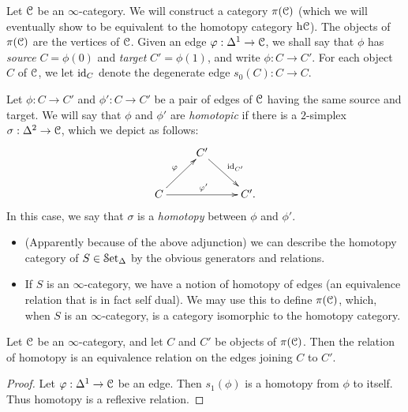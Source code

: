 \begin{1.2.3 The homotopy category}
Let $\operatorname{\mathcal{C}}$ be an $\infty$-category. We will construct a category $\pi(\operatorname{\mathcal{C}})$
(which we will eventually show to be equivalent to the homotopy category $\rm{h} \it{\operatorname{\mathcal{C}}}$). The objects of $\pi(\operatorname{\mathcal{C}})$ are the vertices of $\operatorname{\mathcal{C}}$. Given an
edge $\varphi: \Delta^1 \rightarrow \operatorname{\mathcal{C}}$, we shall say that $\phi$ has {\it source}
$C= \phi(0)$ and {\it target} $C' = \phi(1) $, and write $\phi:
C \rightarrow C'$. For each object $C$ of $\operatorname{\mathcal{C}}$, we
let $\operatorname{id}_{C}$ denote the degenerate edge $s_0(C): C \rightarrow C$.

Let $\phi: C \rightarrow C'$ and $\phi': C \rightarrow C'$ be a pair of edges of $\operatorname{\mathcal{C}}$ having
the same source and target. We will say that $\phi$ and $\phi'$ are {\it homotopic} if
there is a $2$-simplex $\sigma: \Delta^2 \rightarrow \operatorname{\mathcal{C}}$, which we depict as follows:
$$ \xymatrix{
& C' \ar[dr]^{\id_{C'}} & \\
C \ar[ur]^{\phi} \ar[rr]^{\phi'} & & C'.}$$
In this case, we say that $\sigma$ is a {\it homotopy} between $\phi$ and $\phi'$.

\begin{shaded}
\begin{itemize}\squishlist
\setlength{\parindent}{.25in}
\item (Apparently because of the above adjunction) we can describe the homotopy category of $S\in\operatorname{\mathcal{S}et}_\Delta$ by the obvious generators and relations.
\item If $S$ is an $\infty$-category, we have a notion of homotopy of edges (an equivalence relation that is in fact self dual). We may use this to define $\pi(\operatorname{\mathcal{C}})$, which, when $S$ is an $\infty$-category, is a category isomorphic to the homotopy category.
\end{itemize}
\end{shaded}

\begin{proposition}\label{extneeded}
Let $\operatorname{\mathcal{C}}$ be an $\infty$-category, and let $C$ and $C'$ be objects of
$\pi(\operatorname{\mathcal{C}})$. Then the relation of homotopy is an equivalence relation
on the edges joining $C$ to $C'$.
\end{proposition}

\begin{proof}
Let $\varphi: \Delta^1 \rightarrow \operatorname{\mathcal{C}}$ be an edge. Then $s_1(\phi)$ is a homotopy from $\phi$ to
itself. Thus homotopy is a reflexive relation.


\end{proof}
\end{1.2.3 The homotopy category}

